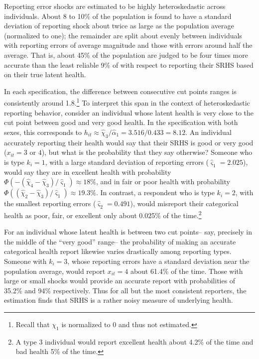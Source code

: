 \documentclass[12pt,pdftex,letterpaper]{article}
\newcommand{\Health}{h}
\newcommand{\Report}{x}
\newcommand{\Cut}{\chi}
\newcommand{\LatentParam}{\alpha}
\newcommand{\ReportStd}{\varsigma}
\begin{document}
Reporting error shocks are estimated to be highly heteroskedastic across individuals. About 8 to 10\% of the population is found to have a standard deviation of reporting shock about twice as large as the population average (normalized to one); the remainder are split about evenly between individuals with reporting errors of average magnitude and those with errors around half the average. That is, about 45\% of the population are judged to be four times more accurate than the least reliable 9\% of with respect to reporting their SRHS based on their true latent health.

In each specification, the difference between consecutive cut points ranges is consistently around 1.8.\footnote{Recall that $\Cut_1$ is normalized to 0 and thus not estimated.} To interpret this span in the context of heteroskedastic reporting behavior, consider an individual whose latent health is very close to the cut point between good and very good health. In the specification with both sexes, this corresponds to $\Health_{it} \approx \hat{\Cut}_3 / \hat{\LatentParam}_1 = 3.516 / 0.433 = 8.12$. An individual accurately reporting their health would say that their SRHS is good or very good ($\Report_{it}=3$ or $4$), but what is the probability that they say otherwise? Someone who is type $k_i=1$, with a large standard deviation of reporting errors ($\hat{\ReportStd}_1 = 2.025$), would say they are in excellent health with probability $\Phi(-(\hat{\Cut}_4 - \hat{\Cut}_3)/\hat{\ReportStd}_1) \approx 18\%$, and in fair or poor health with probability $\Phi((\hat{\Cut}_2 - \hat{\Cut}_3)/\hat{\ReportStd}_1) \approx 19.3\%$. In contrast, a respondent who is type $k_i = 2$, with the smallest reporting errors ($\hat{\ReportStd}_2 = 0.491$), would misreport their categorical health as poor, fair, or excellent only about 0.025\% of the time.\footnote{A type 3 individual would report excellent health about 4.2\% of the time and bad health 5\% of the time.}

For an individual whose latent health is between two cut points-- say, precisely in the middle of the ``very good'' range-- the probability of making an accurate categorical health report likewise varies drastically among reporting types. Someone with $k_i=3$, whose reporting errors have a standard deviation near the population average, would report $\Report_{it}=4$ about 61.4\% of the time. Those with large or small shocks would provide an accurate report with probabilities of 35.2\% and 94\% respectively. Thus for all but the most consistent reporters, the estimation finds that SRHS is a rather noisy measure of underlying health.
\end{document}

